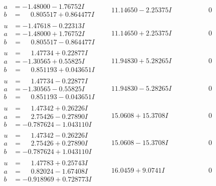 \documentclass[1p]{elsarticle_modified}
\theoremstyle{definition}
\begin{document}
$$\begin{array}{c|c|c}
\begin{aligned}
a &= -1.48000 - 1.76752 I \\
b &= \phantom{-}0.805517 + 0.864477 I\end{aligned}
 & \phantom{-}11.14650 - 2.25375 I & \phantom{-0.000000 } 0 \\ \hline\begin{aligned}
u &= -1.47618 - 0.22313 I \\
a &= -1.48000 + 1.76752 I \\
b &= \phantom{-}0.805517 - 0.864477 I\end{aligned}
 & \phantom{-}11.14650 + 2.25375 I & \phantom{-0.000000 } 0 \\ \hline\begin{aligned}
u &= \phantom{-}1.47734 + 0.22877 I \\
a &= -1.30565 + 0.55825 I \\
b &= \phantom{-}0.851193 + 0.043651 I\end{aligned}
 & \phantom{-}11.94830 + 5.28265 I & \phantom{-0.000000 } 0 \\ \hline\begin{aligned}
u &= \phantom{-}1.47734 - 0.22877 I \\
a &= -1.30565 - 0.55825 I \\
b &= \phantom{-}0.851193 - 0.043651 I\end{aligned}
 & \phantom{-}11.94830 - 5.28265 I & \phantom{-0.000000 } 0 \\ \hline\begin{aligned}
u &= \phantom{-}1.47342 + 0.26226 I \\
a &= \phantom{-}2.75426 - 0.27890 I \\
b &= -0.787624 - 1.043110 I\end{aligned}
 & \phantom{-}15.0608 + 15.3708 I & \phantom{-0.000000 } 0 \\ \hline\begin{aligned}
u &= \phantom{-}1.47342 - 0.26226 I \\
a &= \phantom{-}2.75426 + 0.27890 I \\
b &= -0.787624 + 1.043110 I\end{aligned}
 & \phantom{-}15.0608 - 15.3708 I & \phantom{-0.000000 } 0 \\ \hline\begin{aligned}
u &= \phantom{-}1.47783 + 0.25743 I \\
a &= \phantom{-}0.82024 - 1.67408 I \\
b &= -0.918969 + 0.728773 I\end{aligned}
 & \phantom{-}16.0459 + 9.0741 I & \phantom{-0.000000 } 0 \\ \hline\begin{aligned}

\end{aligned}
\end{array}$$
\end{document}
